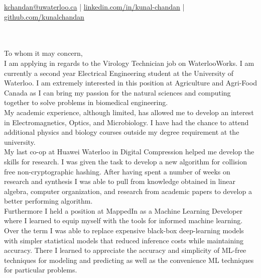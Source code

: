 \documentclass[]{chandan-cv}
\begin{document}
%
%

%
%
{
	\href{mailto:kchandan@uwaterloo.ca}{kchandan@uwaterloo.ca} \qquad
	| \qquad
	\href{https://www.linkedin.com/in/kunal-chandan/}{linkedin.com/in/kunal-chandan} \qquad
	| \qquad
	\href{http://github.com/kunalchandan}{github.com/kunalchandan}
}

\begin{minipage}[t]{0.2\textwidth}
\end{minipage}
\begin{minipage}[t]{0.8\textwidth}
\\
\vspace{10pt}
\large
\\
To whom it may concern,\\


\qquad I am applying in regards to the Virology Technician job on WaterlooWorks.
I am currently a second year Electrical Engineering student at the University of Waterloo. 
I am extremely interested in this position at Agriculture and Agri-Food Canada as I can bring my passion for the natural sciences and computing together to solve problems in biomedical engineering.
\\


\qquad My academic experience, although limited, has allowed me to develop an interest in Electromagnetics, Optics, and Microbiology.
I have had the chance to attend additional physics and biology courses outside my degree requirement at the university. 
\\

\qquad My last co-op at Huawei Waterloo in Digital Compression helped me develop the skills for research. 
I was given the task to develop a new algorithm for collision free non-cryptographic hashing. 
After having spent a number of weeks on research and synthesis I was able to pull from knowledge obtained in linear algebra, computer organization, and research from academic papers to develop a better performing algorithm.
\\

\qquad Furthermore I held a position at MappedIn as a Machine Learning Developer where I learned to equip myself with the tools for informed machine learning. 
Over the term I was able to replace expensive black-box deep-learning models with simpler statistical models that reduced inference costs while maintaining accuracy. 
There I learned to appreciate the accuracy and simplicity of ML-free techniques for modeling and predicting as well as the convenience ML techniques for particular problems. 
\\



\end{minipage}
\end{document}
